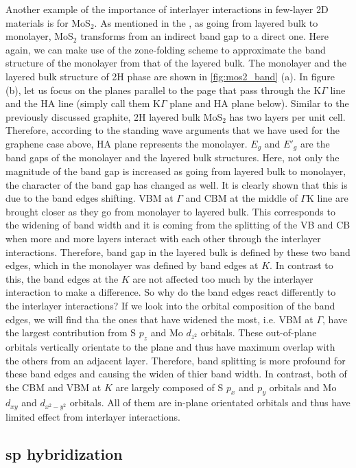 Another example of the importance of interlayer interactions in few-layer 2D materials is for MoS$_2$. As mentioned in the , as going from layered bulk to monolayer, MoS$_2$ transforms from an indirect band gap to a direct one. Here again, we can make use of the zone-folding scheme to approximate the band structure of the monolayer from that of the layered bulk. The monolayer and the layered bulk structure of 2H phase are shown in \autoref{fig:mos2_band} (a). In figure (b), let us focus on the planes parallel to the page that pass through the K$\Gamma$ line and the HA line (simply call them K$\Gamma$ plane and HA plane below). Similar to the previously discussed graphite, 2H layered bulk MoS$_2$ has two layers per unit cell. Therefore, according to the standing wave arguments that we have used for the graphene case above, HA plane represents the monolayer. $E_g$ and $E\prime_g$ are the band gaps of the monolayer and the layered bulk structures. Here, not only the magnitude of the band gap is increased as going from layered bulk to monolayer, the character of the band gap has changed as well. It is clearly shown that this is due to the band edges shifting. VBM at $\Gamma$ and CBM at the middle of $\Gamma$K line are brought closer as they go from monolayer to layered bulk. This corresponds to the widening of band width and it is coming from the splitting of the VB and CB when more and more layers interact with each other through the interlayer interactions. Therefore, band gap in the layered bulk is defined by these two band edges, which in the monolayer was defined by band edges at $K$. In contrast to this, the band edges at the $K$ are not affected too much by the interlayer interaction to make a difference. So why do the band edges react differently to the interlayer interactions? If we look into the orbital composition of the band edges, we will find tha the ones that have widened the most, i.e. VBM at $\Gamma$, have the largest contribution from S $p_z$ and Mo $d_{z^2}$ orbitals. These out-of-plane orbitals vertically orientate to the plane and thus have maximum overlap with the others from an adjacent layer. Therefore, band splitting is more profound for these band edges and causing the widen of thier band width. In contrast, both of the CBM and VBM at $K$ are largely composed of S $p_x$ and $p_y$ orbitals and Mo $d_{xy}$ and $d_{x^2-y^2}$ orbitals. All of them are in-plane orientated orbitals and thus have limited effect from interlayer interactions\cite{Padilha2014}.

\subsection{sp hybridization}


